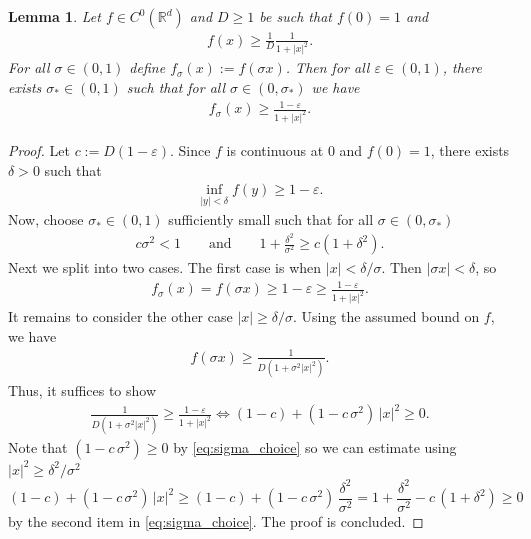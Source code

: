 \documentclass[reqno, 11pt]{amsart}
\numberwithin{equation}{section}
\newtheorem{lem}[thm]{Lemma}
\theoremstyle{definition}
\begin{document}
\begin{lem}
    \label{lem:optimal_slsi_val}
    Let $f\in C^0(\mathbb{R}^{d})$ and $D\geq 1$ be such that $f(0)=1$ and
    \begin{align*}
        f(x)\geq \frac{1}{D}\frac{1}{1+|x|^2}.
    \end{align*}
    For all $\sigma\in (0,1)$ define $f_\sigma(x):=f(\sigma x)$. Then for all $\varepsilon\in (0,1)$, there exists $\sigma_\ast\in (0,1)$ such that for all $\sigma\in (0,\sigma_\ast)$ we have
    \begin{align*}
        f_\sigma(x)\geq \frac{1-\varepsilon}{1+|x|^2}.
    \end{align*}
\end{lem}
\begin{proof}
    Let $c := D(1-\varepsilon)$. Since $f$ is continuous at $0$ and $f(0)=1$, there exists $\delta > 0$ such that
    \begin{align*}
        \inf_{|y|< \delta}f(y) \geq 1 - \varepsilon.
    \end{align*}
    Now, choose $\sigma_\ast \in (0,1)$ sufficiently small such that for all $\sigma \in (0,\sigma_\ast)$
    \begin{align}
        \label{eq:sigma_choice}
        c \sigma^2 < 1
        \qquad \text{and}\qquad1 + \frac{\delta^2}{\sigma^2} \geq c(1+\delta^2).
    \end{align}
    Next we split into two cases. The first case is when $|x| < \delta/\sigma$. Then $|\sigma x| < \delta$, so
    \begin{align*}
        f_\sigma(x)=f(\sigma x) \geq 1 - \varepsilon
        \geq \frac{1-\varepsilon}{1+|x|^2}.
    \end{align*}
    It remains to consider the other case $|x| \geq \delta/\sigma$. Using the assumed bound on $f$, we have
    \begin{align*}
        f(\sigma x) \geq \frac{1}{D(1+\sigma^2|x|^2)}.
    \end{align*}
    Thus, it suffices to show
    \begin{align*}
        \frac{1}{D(1+\sigma^2|x|^2)} \geq \frac{1-\varepsilon}{1+|x|^2} \iff (1-c) + (1-c\,\sigma^2)\,|x|^2 \geq 0.
    \end{align*}
    Note that $(1-c\,\sigma^2) \geq 0$ by \eqref{eq:sigma_choice} so we can estimate using $|x|^2 \geq \delta^2/\sigma^2$
    $$
    (1-c) + (1-c\,\sigma^2)\,|x|^2 \geq (1-c) + (1-c\,\sigma^2)\,\frac{\delta^2}{\sigma^2}  = 1 + \frac{\delta^2}{\sigma^2} - c\,(1+\delta^2)\geq 0
    $$
    by the second item in \eqref{eq:sigma_choice}. The proof is concluded.
\end{proof}
\end{document}
